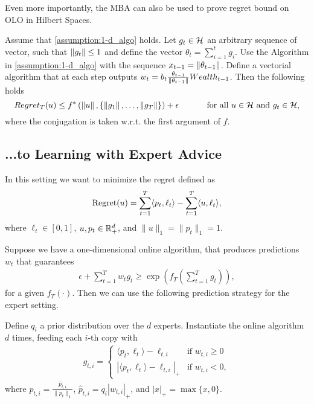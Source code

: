Even more importantly, the \ac{MBA} can also be used to prove regret bound on \ac{OLO} in Hilbert Spaces.

\begin{theorem}
\label{theo:hilbert_reward}
  Assume that \ref{assumption:1-d_algo} holds.
  Let $g_t \in \mathcal{H}$ an arbitrary sequence of vector, such that $\left\|{g_t}\right\| \leq 1$ and define the vector $\theta_t=\sum_{i=1}^{t} g_i$.
  Use the Algorithm in \ref{assumption:1-d_algo} with the sequence $x_{t-1}= \left\|{\theta_{t-1}}\right\|$.
  Define a vectorial algorithm that at each step outputs $w_t = b_t \frac{\theta_{t-1}}{\left\|{\theta_{t-1}}\right\|} Wealth_{t-1}$. Then the following holds
  \[
    Regret_T(u) \leq f^*\left( \left\|{u}\right\|, \left\{\left\|{g_1}\right\|, \ldots, \left\|{g_T}\right\|\right\}\right)+\epsilon \quad \quad \quad \textnormal{ for all } u \in \mathcal{H} \textnormal{ and } g_t \in \mathcal{H},
  \]
  where the conjugation is taken w.r.t. the first argument of $f$.
\end{theorem}

\subsection{...to Learning with Expert Advice}

In this setting we want to minimize the regret defined as
\[
\operatorname{Regret}(u) = \sum_{t=1}^T \langle p_t, \ell_t \rangle - \sum_{t=1}^T \langle u, \ell_t \rangle,
\]
where $\ell_t \in [0,1]$, $u, p_t \in \mathbb{R}^d_+$, and $\|u\|_1 = \|p_t\|_1 = 1$.

Suppose we have a one-dimensional online algorithm, that produces
predictions $w_t$ that guarantees
\begin{align}
\label{eq:def_f}
\epsilon + \sum_{t=1}^T w_t g_t \ge \exp\left(f_T\left(\sum_{t=1}^T g_t\right)\right),
\end{align}
for a given $f_T(\cdot)$. Then we can use the following prediction strategy for the expert setting.

Define $q_i$ a prior distribution over the $d$ experts. Instantiate the online algorithm
$d$ times, feeding each $i$-th copy with
\begin{align}
g_{t,i} = \begin{cases}
\langle p_t, \ell_t\rangle - \ell_{t,i} & \text{if } w_{t,i} \ge 0 \\
|\langle p_t, \ell_t\rangle - \ell_{t,i}|_+ & \text{if } w_{t,i} < 0,
\end{cases}
\end{align}
where $p_{t,i} = \frac{\hat{p}_{t,i}}{\|p_{t}\|_1}$, $\hat{p}_{t,i}=q_i |w_{t,i}|_+$, and $|x|_+=\max\{x,0\}$.

